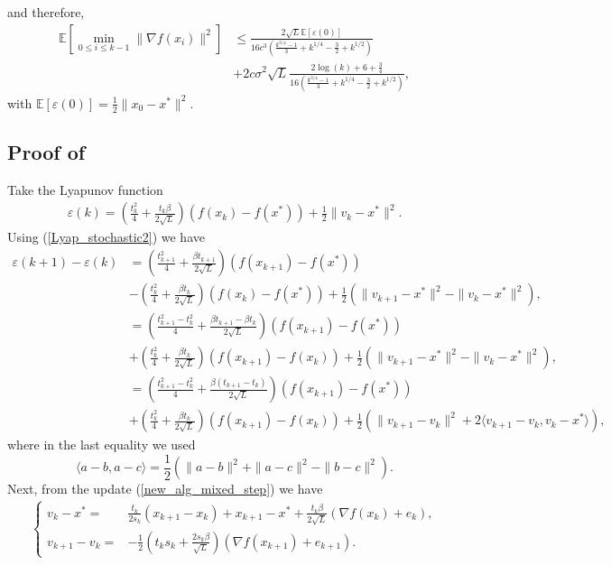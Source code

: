 \documentclass{article}
\theoremstyle{plain}
\theoremstyle{definition}
\theoremstyle{remark}
\begin{document}
and therefore,
\begin{align}
    \mathbb E\left[\min_{0\leq i\leq k-1}\|\nabla f(x_i)\|^2 \right] &\leq \frac{2\sqrt{L}\mathbb E[\varepsilon (0)]}{16c^3\left( \frac{k^{3/4}-1}{3} +k^{1/4}-\frac{3}{2}+k^{1/2}\right)}\nonumber\\
    &+2c\sigma^2\sqrt{L}\frac{2\log (k)+6+\frac{3}{4}}{16\left( \frac{k^{3/4}-1}{3} +k^{1/4}-\frac{3}{2}+k^{1/2}\right)},
\end{align}
with $\mathbb E[\varepsilon(0)]=\tfrac{1}{2}\|x_0-x^*\|^2$.
\subsection{Proof of }\label{thm7_proof}
Take the Lyapunov function
    \begin{align}\label{Lyap_stochastic2}
    \varepsilon(k)= (\frac{t_k^2}{4}+\frac{t_k\beta}{2\sqrt{L}})(f(x_k)-f(x^*))+\frac{1}{2}\|v_k-x^*\|^2.
    \end{align}
     Using (\ref{Lyap_stochastic2}) we have
    \begin{align}\label{Lyap2_stc_1}
        \varepsilon(k+1)-\varepsilon(k)&=(\frac{t_{k+1}^2}{4}+\frac{\beta t_{k+1}}{2\sqrt{L}})(f(x_{k+1})-f(x^*))\nonumber\\
        &-(\frac{t_{k}^2}{4}+\frac{\beta t_{k}}{2\sqrt{L}})(f(x_{k})-f(x^*))+\frac{1}{2}(\|v_{k+1}-x^*\|^2-\|v_{k}-x^*\|^2),\nonumber\\
        & = (\frac{t_{k+1}^2-t_k^2}{4}+\frac{\beta t_{k+1}-\beta t_k}{2\sqrt{L}})(f(x_{k+1})-f(x^*))\nonumber\\
        &+(\frac{t_{k}^2}{4}+\frac{\beta t_{k}}{2\sqrt{L}})(f(x_{k+1})-f(x_k))+\frac{1}{2}(\|v_{k+1}-x^*\|^2-\|v_{k}-x^*\|^2),\nonumber\\
        &= (\frac{t_{k+1}^2-t_k^2}{4}+\frac{\beta(t_{k+1}-t_k)}{2\sqrt{L}})(f(x_{k+1})-f(x^*))\nonumber\\
        &+(\frac{t_{k}^2}{4}+\frac{\beta t_{k}}{2\sqrt{L}})(f(x_{k+1})-f(x_k))+\frac{1}{2}(\|v_{k+1}-v_k\|^2+2\langle v_{k+1}-v_k,v_k-x^*\rangle),
    \end{align}
    where in the last equality we used 
    $$\langle a-b,a-c\rangle = \frac{1}{2}(\|a-b\|^2+\|a-c\|^2-\|b-c\|^2).$$
    Next, from the update (\ref{new_alg_mixed_step}) we have
    \begin{align}\label{Lyap2_stc_2}
        \left\{\begin{array}{cl}
             v_k-x^*=&\frac{t_k}{2s_k}(x_{k+1}-x_k)+x_{k+1}-x^*+\frac{t_k\beta }{2\sqrt{L}}(\nabla f(x_k)+e_k),  \\
            v_{k+1}-v_k=& -\frac{1}{2}(t_ks_k+\tfrac{2s_k\beta}{\sqrt{L}}) (\nabla f(x_{k+1})+e_{k+1}).
        \end{array}\right.
    \end{align}
\end{document}
